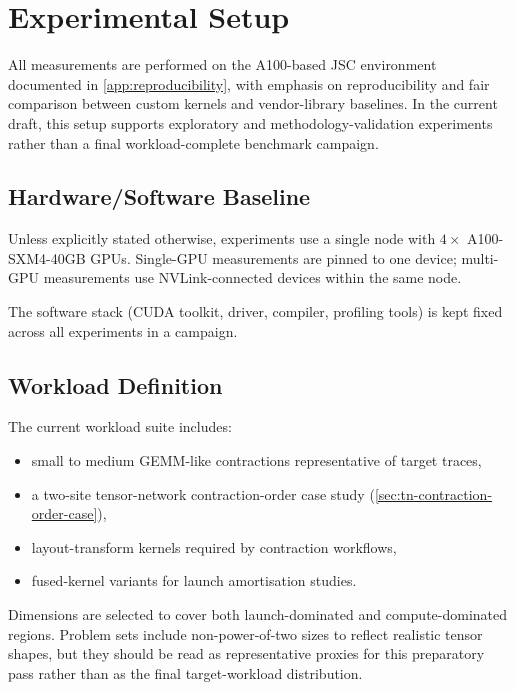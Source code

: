 \section{Experimental Setup}\label{sec:experimental-setup}

All measurements are performed on the A100-based JSC environment documented in
\cref{app:reproducibility}, with emphasis on reproducibility and fair
comparison between custom kernels and vendor-library baselines. In the current
draft, this setup supports exploratory and methodology-validation experiments
rather than a final workload-complete benchmark campaign.

\subsection{Hardware/Software Baseline}

Unless explicitly stated otherwise, experiments use a single node with
$4\times$ A100-SXM4-40GB GPUs. Single-GPU measurements are pinned to one device;
multi-GPU measurements use NVLink-connected devices within the same node.

The software stack (CUDA toolkit, driver, compiler, profiling tools) is kept
fixed across all experiments in a campaign.

\subsection{Workload Definition}

The current workload suite includes:

\begin{itemize}
  \item small to medium GEMM-like contractions representative of target traces,
  \item a two-site tensor-network contraction-order case study
    (\cref{sec:tn-contraction-order-case}),
  \item layout-transform kernels required by contraction workflows,
  \item fused-kernel variants for launch amortisation studies.
\end{itemize}

Dimensions are selected to cover both launch-dominated and compute-dominated
regions. Problem sets include non-power-of-two sizes to reflect realistic
tensor shapes, but they should be read as representative proxies for this
preparatory pass rather than as the final target-workload distribution.

